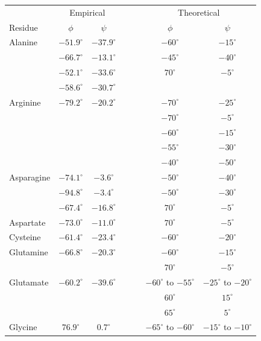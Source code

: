 \documentclass[12pt]{article}
\begin{document}
\begin{center}
\footnotesize
\begin{tabular}{lccccc}
&  \multicolumn{2}{c}{Empirical} & ~~~& \multicolumn{2}{c}{Theoretical}\\\cline{2-3}\cline{5-6}
Residue & $\phi$ & $\psi$ & & $\phi$ & $\psi$ \\
\hline Alanine & $-51.9^{\circ}$ & $-37.9^{\circ}$ & & $-60^{\circ}$ & $-15^{\circ}$ \\
                      &  $-66.7^{\circ}$ & $-13.1^{\circ}$ &  & $-45^{\circ}$& $-40^{\circ}$\\
                      & $-52.1^{\circ}$ & $-33.6^{\circ}$ & & $70^{\circ}$& $-5^{\circ}$\\
                      & $-58.6^{\circ}$ & $-30.7^{\circ}$& &\\
Arginine        & $-79.2^{\circ}$ & $-20.2^{\circ}$ & & $-70^{\circ}$ & $-25^{\circ}$ \\
		 &	&	& & $-70^{\circ}$ & $-5^{\circ}$\\
		 &	&	& & $-60^{\circ}$ & $-15^{\circ}$\\
		 &	&	& & $-55^{\circ}$ & $-30^{\circ}$\\
		 &	&	& & $-40^{\circ}$ & $-50^{\circ}$\\      
Asparagine      & $-74.1^{\circ}$ & $-3.6^{\circ}$ & & $-50^{\circ}$ & $-40^{\circ}$ \\
                    & $-94.8^{\circ}$& $-3.4^{\circ}$& & $-50^{\circ}$ & $-30^{\circ}$\\
		& $-67.4^{\circ}$& $-16.8^{\circ}$& & $70^{\circ}$& $-5^{\circ}$\\
Aspartate    & $-73.0^{\circ}$ & $-11.0^{\circ}$ & & $70^{\circ}$ & $-5^{\circ}$ \\
Cysteine        & $-61.4^{\circ}$ & $-23.4^{\circ}$ & & $-60^{\circ}$ & $-20^{\circ}$ \\
Glutamine      & $-66.8^{\circ}$ & $-20.3^{\circ}$ & & $-60^{\circ}$ & $-15^{\circ}$  \\
		&	&	& & $70^{\circ}$ & $-5^{\circ}$\\
Glutamate     & $-60.2^{\circ}$ & $-39.6^{\circ}$ & & $-60^{\circ}$ to $-55^{\circ}$ & $-25^{\circ}$ to $-20^{\circ}$ \\
		&      	&	& & $60^{\circ}$ & $15^{\circ}$\\
		&	&	& & $65^{\circ}$ & $5^{\circ}$\\
Glycine          & $76.9^{\circ}$ & $0.7^{\circ}$ & & $-65^{\circ}$ to $-60^{\circ}$ & $-15^{\circ}$ to $-10^{\circ}$  \\

\end{tabular}
\end{center}
\end{document}
